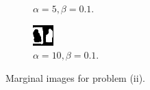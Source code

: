 \documentclass{article}
\begin{document}
\begin{figure}[t]
\begin{subfigure}[t]{0.25\textwidth}
  \vspace{-0.6cm}
  \caption{$\alpha=5, \beta=0.1$.}
  \label{f:ii-2}
\end{subfigure}
\begin{subfigure}[t]{0.25\textwidth}
  \centering
  \includegraphics[width=\textwidth]{ii_alpha_10_beta_0.1.bmp}
  \vspace{-0.6cm}
  \caption{$\alpha=10, \beta=0.1$.}
  \label{f:ii-3}
\end{subfigure}
\vspace{-0.3cm}
\caption{Marginal images for problem (ii).}
\label{f:denoise_ii}
\end{figure}
\\
\end{document}
